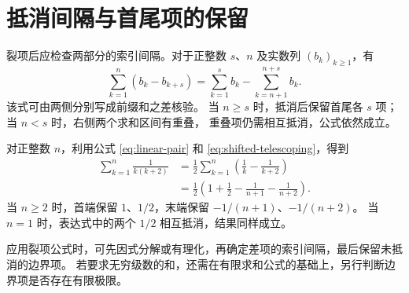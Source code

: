 \documentclass[UTF8,12pt,a4paper,fontset=fandol]{ctexart}
\begin{document}
\section{抵消间隔与首尾项的保留}

裂项后应检查两部分的索引间隔。对于正整数 $s$、$n$ 及实数列 $(b_k)_{k\ge1}$，有
\begin{equation}\label{eq:shifted-telescoping}
  \sum_{k=1}^{n}(b_k-b_{k+s})
  =\sum_{k=1}^{s}b_k-\sum_{k=n+1}^{n+s}b_k.
\end{equation}
该式可由两侧分别写成前缀和之差核验。
当 $n\ge s$ 时，抵消后保留首尾各 $s$ 项；当 $n<s$ 时，右侧两个求和区间有重叠，
重叠项仍需相互抵消，公式依然成立。

\begin{example}[间隔为二的裂项]
对正整数 $n$，利用公式 \eqref{eq:linear-pair} 和 \eqref{eq:shifted-telescoping}，得到
\begin{align*}
  \sum_{k=1}^{n}\frac1{k(k+2)}
  &=\frac12\sum_{k=1}^{n}\left(\frac1k-\frac1{k+2}\right)\\
  &=\frac12\left(1+\frac12-\frac1{n+1}-\frac1{n+2}\right).
\end{align*}
当 $n\ge2$ 时，首端保留 $1$、$1/2$，末端保留 $-1/(n+1)$、$-1/(n+2)$。
当 $n=1$ 时，表达式中的两个 $1/2$ 相互抵消，结果同样成立。
\end{example}

应用裂项公式时，可先因式分解或有理化，再确定差项的索引间隔，最后保留未抵消的边界项。
若要求无穷级数的和，还需在有限求和公式的基础上，另行判断边界项是否存在有限极限。
\end{document}
